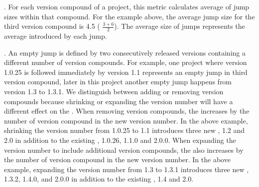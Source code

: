 \documentclass[conference]{IEEEtran}
\begin{document}
 
. For each version compound of a project, this metric calculates average of  jump sizes within that compound. 
For the example above, the average jump size for the third version compound is 4.5 ( $\frac{ 3 + 6 }{2}$).
The average size of jumps represents the average \numberchoices introduced by each jump.

 



. An empty jump is defined by two consecutively released versions containing a different number of version compounds. 
For example, one project where version 1.0.25 is followed immediately by version 1.1 represents an empty jump in third version compound, later in this project another empty jump happens from version 1.3 to 1.3.1. 
We distinguish between adding or removing version compounds because shrinking or expanding the version number will have a different effect on the \numberchoices. 
When removing version compounds, the \numberchoices increases by the number of version compound in the new version number. In the above example, shrinking the version number from 1.0.25 to 1.1 introduces three new \choices, 1.2 and 2.0 in addition to the existing \choices, 1.0.26, 1.1.0 and 2.0.0. 
When expanding the version number to include additional version compounds, the \numberchoices also increases by the number of version compound in the new version number. In the above example, expanding the version number from 1.3 to 1.3.1 introduces three new \choices, 1.3.2, 1.4.0, and 2.0.0 in addition to the existing \choices, 1.4 and 2.0. \\

\end{document}
